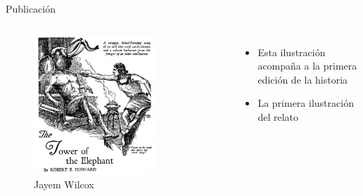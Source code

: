 \begin{frame}{Publicación}
	\begin{columns}
		\begin{figure}[htb]
			\centering
			\includegraphics[width=0.75\textwidth]{img/JayemWilcoxTowerOfTheElephant}
			\caption{Jayem Wilcox}
		\end{figure}
		\begin{itemize}
			\item Esta ilustración acompaña a la primera edición de la historia
			\item La primera ilustración del relato
		\end{itemize}
	\end{columns}
\end{frame}

